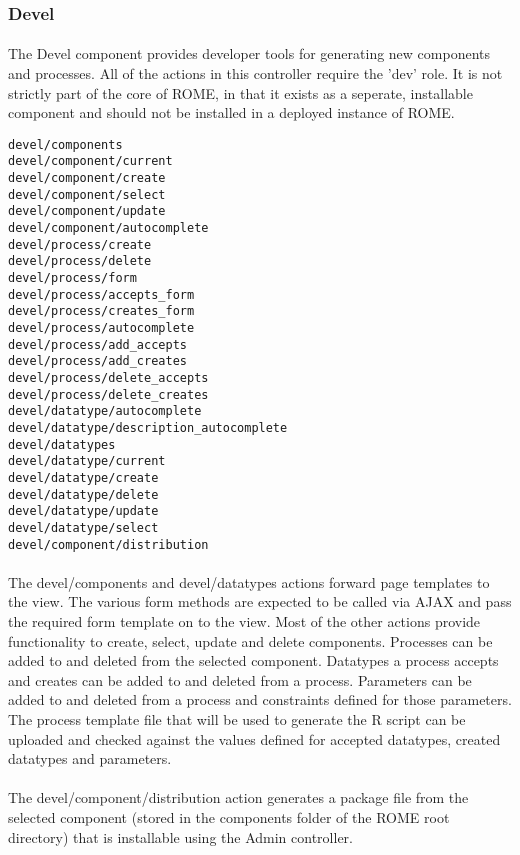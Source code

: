 \subsubsection{Devel}
\label{sec:controller_devel}
\paragraph{}
The Devel component provides developer tools for generating new components and processes. All of the actions in this controller require the 'dev' role. It is not strictly part of the core of ROME, in that it exists as a seperate, installable component and should not be installed in a deployed instance of ROME.

\begin{scriptsize}
\begin{verbatim}
devel/components
devel/component/current
devel/component/create
devel/component/select
devel/component/update
devel/component/autocomplete
devel/process/create
devel/process/delete
devel/process/form
devel/process/accepts_form
devel/process/creates_form
devel/process/autocomplete
devel/process/add_accepts
devel/process/add_creates
devel/process/delete_accepts
devel/process/delete_creates
devel/datatype/autocomplete
devel/datatype/description_autocomplete
devel/datatypes
devel/datatype/current
devel/datatype/create
devel/datatype/delete
devel/datatype/update
devel/datatype/select
devel/component/distribution
\end{verbatim}
\end{scriptsize}

\paragraph{}
The devel/components and devel/datatypes actions forward page templates to the view. The various form methods are expected to be called via AJAX and pass the required form template on to the view. Most of the other actions provide functionality to create, select, update and delete components. Processes can be added to and deleted from the selected component. Datatypes a process accepts and creates can be added to and deleted from a process. Parameters can be added to and deleted from a process and constraints defined for those parameters. The process template file that will be used to generate the R script can be uploaded and checked against the values defined for accepted datatypes, created datatypes and parameters. 


\paragraph{}
The devel/component/distribution action generates a package file from the selected component (stored in the components folder of the ROME root directory) that is installable using the Admin controller.
